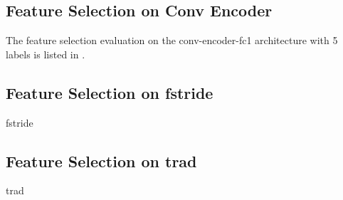 
\subsection{Feature Selection on Conv Encoder}
The feature selection evaluation on the conv-encoder-fc1 architecture with 5 labels is listed in .
% 
% 
% 




\subsection{Feature Selection on fstride}
fstride


\subsection{Feature Selection on trad}
trad


